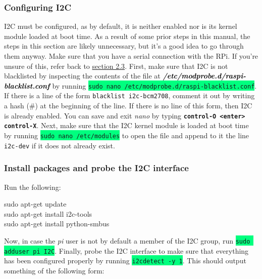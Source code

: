 \documentclass{article}
\newcommand*{\myfont}{\fontfamily{pcr}\selectfont}
\newcommand{\codei}[1]{\colorbox{SpringGreen}{\texttt{#1}}} %
\newcommand{\codeb}[2]{
  \begin{tcolorbox}[width=\textwidth,colback={SpringGreen},title={#1},colbacktitle=darkgreen,coltitle=SpringGreen]
    \myfont
    #2
  \end{tcolorbox}
} %
\newcommand{\outputi}[1]{\colorbox{light-gray}{\texttt{#1}}} %
\newcommand{\red}[1]{\textcolor{BrickRed}{#1}} %
\newcommand{\loc}[1]{\textit{\textcolor{Black}{\textbf{#1}}}} %
\begin{document}
    \subsubsection{Configuring I2C}
      \label{sec:configuring-i2c}
      I2C must be configured, as by default, it is neither enabled nor is its kernel module loaded at boot time. As a result of some prior steps in this manual, the steps in this section are likely unnecessary, but it's a good idea to go through them anyway. Make sure that you have a serial connection with the RPi. If you're unsure of this, refer back to \hyperref[sec:connect-serial]{section 2.3}.
      \newline
      \indent
      First, make sure that I2C is not blacklisted by inspecting the contents of the file at \loc{/etc/modprobe.d/raspi-blacklist.conf} by running \codei{sudo nano /etc/modprobe.d/raspi-blacklist.conf}. If there is a line of the form \outputi{blacklist i2c-bcm\red{2708}}, comment it out by writing a hash (\#) at the beginning of the line. If there is no line of this form, then I2C is already enabled. You can save and exit \textit{nano} by typing \texttt{\textbf{control-O <enter> control-X}}.
      \newline
      \indent
      Next, make sure that the I2C kernel module is loaded at boot time by running \codei{sudo nano /etc/modules} to open the file and append to it the line \outputi{i2c-dev} if it does not already exist.
      \newline
      \indent
    \subsubsection{Install packages and probe the I2C interface}
    Run the following:
    \codeb{Update environment and install necessary packages}{
      sudo apt-get update \\
      sudo apt-get install i2c-tools \\
      sudo apt-get install python-smbus
    }

    Now, in case the \textit{pi} user is not by default a member of the I2C group, run \codei{sudo adduser pi I2C}.
    \newline
    Finally, probe the I2C interface to make sure that everything has been configured properly by running \codei{i2cdetect -y 1}. This should output something of the following form:
\end{document}
